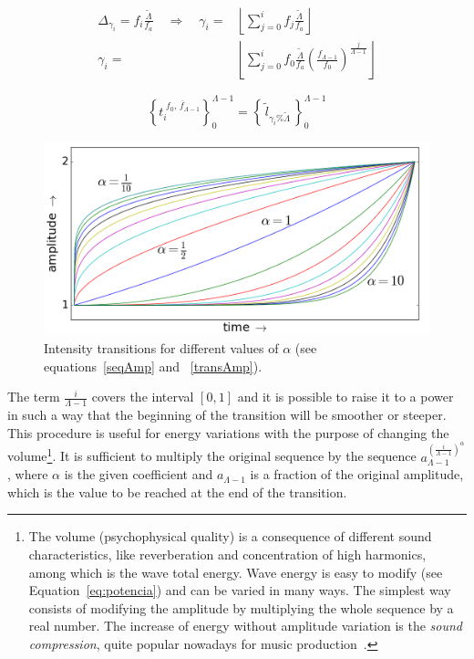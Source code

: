 \begin{equation}\label{indiceExponencial}
\begin{split}
 \Delta_{\gamma_i}= f_i\frac{\widetilde{\Lambda}}{f_a} \quad \Rightarrow  \quad \gamma_i= & \left \lfloor \sum_{j=0}^{i} f_j\frac{\widetilde{\Lambda}}{f_a} \right \rfloor \\ \gamma_i = & \left \lfloor \sum_{j=0}^{i} f_0 \frac{\widetilde{\Lambda}}{f_a} \left ( \frac{f_{\Lambda-1}}{f_0} \right ) ^{\frac{j}{\Lambda -1}} \right \rfloor
\end{split}
\end{equation}

\begin{equation}\label{serieAmostralLog}
 \left\{t_i^{\;\overline{f_0,\,f_{\Lambda-1}}}\right\}_0^{\Lambda-1}=\left\{\,\widetilde{l}_{\gamma_i \% \widetilde{\Lambda}}\,\right\}_0^{\Lambda-1}
\end{equation}

\begin{figure}[h!]
     \centering
         \includegraphics[width=.7\columnwidth]{figures/transicao_}
     \caption{Intensity transitions for different values of $\alpha$ (see equations~\ref{seqAmp} and ~\ref{transAmp}).}
         \label{fig:transicao}
\end{figure}

The term $\frac{i}{\Lambda-1}$ covers the interval $[0,1]$ and it is possible to raise it to a power in such a way that the beginning of the transition will be smoother or steeper. This procedure is useful for energy variations with the purpose of changing the volume\footnote{The volume (psychophysical quality) is a consequence of different sound characteristics, like reverberation and concentration of high harmonics, among which is the wave total energy. Wave energy is easy to modify (see Equation~\ref{eq:potencia}) and can be varied in many ways. The simplest way consists of modifying the amplitude by multiplying the whole sequence by a real number. The increase of energy without amplitude variation is the \emph{sound compression}, quite popular nowadays for music production~\cite{guillaume}.}. It is sufficient to multiply the original sequence by the sequence $a_{\Lambda-1}^{\left( \frac{i}{\Lambda-1} \right )^\alpha}$, where $\alpha$ is the given coefficient and $a_{\Lambda-1}$ is a fraction of the original amplitude, which is the value to be reached at the end of the transition.

